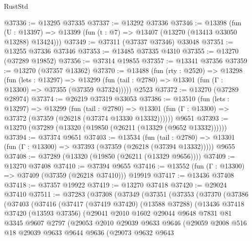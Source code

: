 \begin{lexlean}{RustStd}
\begin{coremodule}
@37336 := @13295 @37335
@37337 := @13292 @37336
@37346 := @13398
    (fun (U : @13397) => @13399 (fun (t : @7) => @13407 (@13270 (@13413 @33050 @13288) @13424)))
@37349 := @37311 (@37337 @37346) @33048
@37351 := @13255 @37336 @37346
@37353 := @13485 @37335 @4310
@37355 := @13270 (@37289 @19852)
@37356 := @37314 @19855
@37357 := @13341 @37356
@37359 := @13270 (@37357 @13362)
@37370 := @13488
    (fun (rty : @2520) =>
    @13298
      (fun (lets : @13297) =>
      @13299 (fun (tail : @2780) => @13301 (fun (Γ : @13300) => @37355 (@37359 @37324)))))
    @2523
@37372 := @13270 (@37289 @28974)
@37374 := @26219 @37319 @33053
@37386 := @13510
    (fun (lets : @13297) =>
    @13299
      (fun (tail : @2780) =>
      @13301 (fun (Γ : @13300) => @37372 (@37359 (@26218 (@37374 @13330 @13332))))))
    @9651
@37393 := @13270 (@37289 (@13320 (@19850 (@26211 (@13329 (@9652 @13332))))))
@37394 := @37374 @9651
@37403 := @13534
    (fun (tail : @2780) => @13301 (fun (Γ : @13300) => @37393 (@37359 (@26218 (@37394 @13332)))))
    @9655
@37408 := @37289 (@13320 (@19850 (@26211 (@13329 @9656))))
@37409 := @13270 @37408
@37410 := @37394 @9655
@37416 := @13552 (fun (Γ : @13300) => @37409 (@37359 (@26218 @37410))) @19919
@37417 := @13436 @37408
@37418 := @37357 @19922
@37419 := @13270 @37418
@37420 := @29024 @37410
@37511 := @37283
    (@37308
      (@37349
        (@37351
          (@37353
            (@37370
              (@37386
                (@37403
                  (@37416
                    (@37417
                      (@37419 @37420)
                      (@13588 @37288)
                      (@13436
                        @37418
                        @37420
                        (@13593 @37356)
                        (@29041
                          @2010
                          @1602
                          @29044
                          @9648
                          @7831
                          @81
                          @3345
                          @9607
                          @2797
                          (@29053
                            @2010
                            @29039
                            @9633
                            @9646
                            (@29059
                              @2008
                              @516
                              @18
                              @29039
                              @9633
                              @9644
                              @9636
                              (@29073
                                @9632
                                @9643

\end{coremodule}
\end{lexlean}
